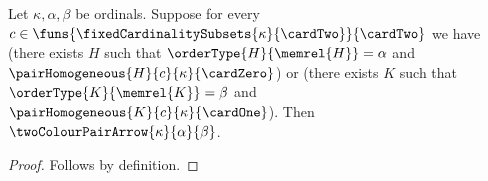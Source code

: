 \begin{proposition}\label{two_colour_pair_arrow_intro}
    Let $\kappa,\alpha,\beta$ be ordinals.
    Suppose for every
        $c\in\funs{\fixedCardinalitySubsets{\kappa}{\cardTwo}}
            {\cardTwo}$ we have
        (there exists $H$ such that
            $\orderType{H}{\memrel{H}}=\alpha$ and
            $\pairHomogeneous{H}{c}{\kappa}{\cardZero}$) or
        (there exists $K$ such that
            $\orderType{K}{\memrel{K}}=\beta$ and
            $\pairHomogeneous{K}{c}{\kappa}{\cardOne}$).
    Then $\twoColourPairArrow{\kappa}{\alpha}{\beta}$.
\end{proposition}
\begin{proof}
    Follows by definition.
\end{proof}
